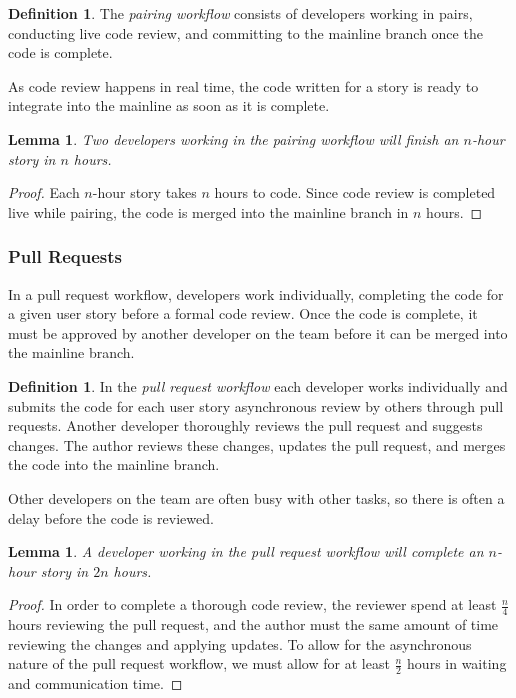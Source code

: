 \documentclass[letterpaper]{article}
\newtheorem{lemma}[theorem]{Lemma}
\theoremstyle{definition}
\newtheorem{definition}[theorem]{Definition}
\begin{document}
    \begin{definition}
        The \textit{pairing workflow} consists of developers working in pairs, conducting live code review, and
        committing to the mainline branch once the code is complete.
    \end{definition}

    As code review happens in real time, the code written for a story is ready to integrate into the mainline as soon as
    it is complete.

    \begin{lemma}
        \label{lemma:pair}
        Two developers working in the pairing workflow will finish an $n$-hour story in $n$ hours.
    \end{lemma}
    \begin{proof}
        Each $n$-hour story takes $n$ hours to code.
        Since code review is completed live while pairing, the code is merged into the mainline branch in $n$ hours.
    \end{proof}

    \subsubsection{Pull Requests}\label{subsubsec:pull-requests}

    In a pull request workflow, developers work individually, completing the code for a given user story before a formal
    code review.
    Once the code is complete, it must be approved by another developer on the team before it can be merged into the
    mainline branch.

    \begin{definition}
        In the \textit{pull request workflow} each developer works individually and submits the code for each user story
        asynchronous review by others through pull requests.
        Another developer thoroughly reviews the pull request and suggests changes.
        The author reviews these changes, updates the pull request, and merges the code into the mainline branch.
    \end{definition}

    Other developers on the team are often busy with other tasks, so there is often a delay before the code is reviewed.

    \begin{lemma}
        \label{lemma:solo}
        A developer working in the pull request workflow will complete an $n$-hour story in $2n$ hours.
    \end{lemma}
    \begin{proof}
        In order to complete a thorough code review, the reviewer spend at least $\frac{n}{4}$ hours reviewing the pull
        request, and the author must the same amount of time reviewing the changes and applying updates.
        To allow for the asynchronous nature of the pull request workflow, we must allow for at least $\frac{n}{2}$
        hours in waiting and communication time.
    \end{proof}
\end{document}
